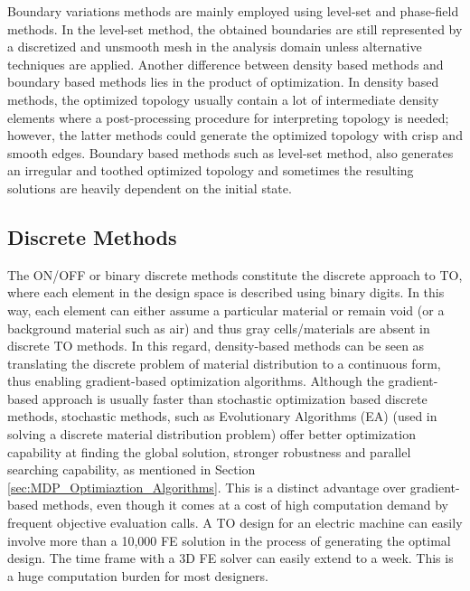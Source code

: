 Boundary variations methods are mainly employed using level-set and phase-field  methods. In  the  level-set  method,  the  obtained  boundaries  are  still  represented  by  a discretized and unsmooth  mesh  in  the  analysis  domain  unless  alternative techniques are applied. Another  difference  between  density  based  methods  and  boundary  based  methods  lies in  the  product  of  optimization. In  density  based  methods,  the  optimized  topology  usually contain  a lot  of  intermediate  density  elements  where  a post-processing  procedure  for interpreting  topology  is  needed;  however,  the  latter  methods  could  generate  the  optimized topology with crisp and smooth edges. Boundary  based  methods  such as  level-set  method,  also  generates an irregular and toothed  optimized  topology  and  sometimes the  resulting  solutions  are  heavily dependent on the initial state.

\subsection{Discrete Methods}

The ON/OFF or binary discrete methods constitute the discrete approach to TO, where each element in the design space is described using binary digits. In this way, each element can either assume a particular material or remain void (or a background material such as air) \parencite{midha_2018} and thus gray cells/materials are absent in discrete TO methods. In this regard, density-based methods can be seen as translating the discrete problem of material distribution to a continuous form, thus enabling gradient-based optimization algorithms. Although the gradient-based approach is usually faster than stochastic optimization based discrete methods, stochastic methods, such as Evolutionary Algorithms (EA) (used in solving a discrete material distribution problem) offer better optimization capability at finding the global solution, stronger robustness and parallel searching capability, as mentioned in Section \ref{sec:MDP_Optimiaztion_Algorithms}. This is a distinct advantage over gradient-based methods, even though it comes at a cost of high computation demand by frequent objective evaluation calls. A TO design for an electric machine can easily involve more than a 10,000 FE solution in the process of generating the optimal design. The time frame with a 3D FE solver can easily extend to a week. This is a huge computation burden for most designers.

